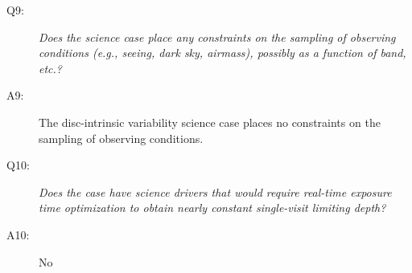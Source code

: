 \begin{description}
\item[Q9:] {\it Does the science case place any constraints on the
sampling of observing conditions (e.g., seeing, dark sky, airmass),
possibly as a function of band, etc.?}

\item[A9:] The disc-intrinsic variability science case places no constraints on
the sampling of observing conditions.

\item[Q10:] {\it Does the case have science drivers that would require
real-time exposure time optimization to obtain nearly constant
single-visit limiting depth?}

\item[A10:] No

\end{description}


\navigationbar
